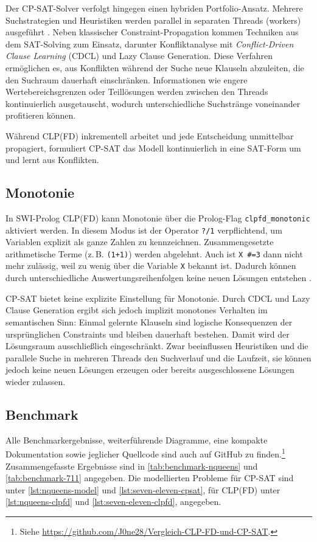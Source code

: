 \documentclass[12pt,a4paper]{article}
\begin{document}
Der CP-SAT-Solver verfolgt hingegen einen hybriden Portfolio-Ansatz.
Mehrere Suchstrategien und Heuristiken werden parallel in separaten Threads (workers) ausgeführt \cite{perron}.
Neben klassischer Constraint-Propagation kommen Techniken aus dem SAT-Solving zum Einsatz, darunter Konfliktanalyse mit \emph{Conflict-Driven Clause Learning} (CDCL) und Lazy Clause Generation.
Diese Verfahren ermöglichen es, aus Konflikten während der Suche neue Klauseln abzuleiten, die den Suchraum dauerhaft einschränken.
Informationen wie engere Wertebereichsgrenzen oder Teillösungen werden zwischen den Threads kontinuierlich ausgetauscht, wodurch unterschiedliche Suchstränge voneinander profitieren können. 

Während CLP(FD) inkrementell arbeitet und jede Entscheidung unmittelbar propagiert, formuliert CP-SAT das Modell kontinuierlich in eine SAT-Form um und lernt aus Konflikten.
\subsection{Monotonie}
\label{sec:monotonie}
In SWI-Prolog CLP(FD) kann Monotonie über die Prolog-Flag \texttt{clpfd\_monotonic} aktiviert werden.  
In diesem Modus ist der Operator \texttt{?/1} verpflichtend, um Variablen explizit als ganze Zahlen zu kennzeichnen.
Zusammengesetzte arithmetische Terme (z.\,B. \texttt{(1+1)}) werden abgelehnt.
Auch ist \texttt{X \#=3} dann nicht mehr zulässig, weil zu wenig über die Variable \texttt{X} bekannt ist.   
Dadurch können durch unterschiedliche Auswertungsreihenfolgen keine neuen Lösungen entstehen \cite{swi-clpfd-doc}.

CP-SAT bietet keine explizite Einstellung für Monotonie.
Durch CDCL und Lazy Clause Generation ergibt sich jedoch implizit monotones Verhalten im semantischen Sinn: Einmal gelernte Klauseln sind logische Konsequenzen der ursprünglichen Constraints und bleiben dauerhaft bestehen.
Damit wird der Lösungsraum ausschließlich eingeschränkt.
Zwar beeinflussen Heuristiken und die parallele Suche in mehreren Threads den Suchverlauf und die Laufzeit, sie können jedoch keine neuen Lösungen erzeugen oder bereits ausgeschlossene Lösungen wieder zulassen.
\subsection{Benchmark}
Alle Benchmarkergebnisse, weiterführende Diagramme, eine kompakte Dokumentation sowie jeglicher Quellcode sind auch auf GitHub zu finden.\footnote{Siehe \url{https://github.com/J0ne28/Vergleich-CLP-FD-und-CP-SAT}.}
Zusammengefasste Ergebnisse sind in \autoref{tab:benchmark-nqueens} und \autoref{tab:benchmark-711} angegeben.
Die modellierten Probleme für CP-SAT sind unter \autoref{lst:nqueens-model} und \autoref{lst:seven-eleven-cpsat}, für CLP(FD) unter \autoref{lst:nqueens-clpfd} und \autoref{lst:seven-eleven-clpfd}, angegeben.
\label{sec:performance}
\end{document}

